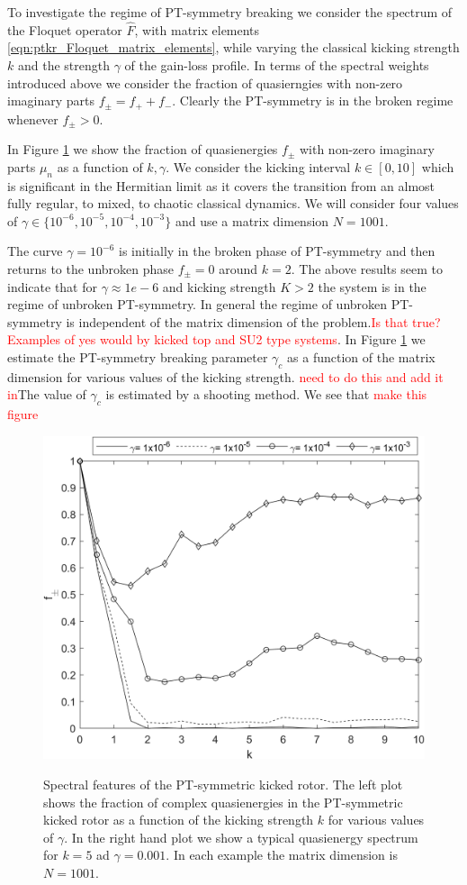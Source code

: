 \documentclass{iopart}
\begin{document}
To investigate the regime of PT-symmetry breaking we consider the spectrum of the Floquet operator $\hat{F}$, with matrix elements \ref{eqn:ptkr_Floquet_matrix_elements}, while varying the classical kicking strength $k$ and the strength $\gamma$ of the gain-loss profile. In terms of the spectral weights introduced above we consider the fraction of quasierngies with non-zero imaginary parts $f_{\pm}=f_{+}+f_{-}$. Clearly the PT-symmetry is in the broken regime whenever $f_{\pm}>0$.  

In Figure \ref{fig:ptkr_brokem_regieme} we show the fraction of quasienergies $f_{\pm}$ with non-zero imaginary parts $\mu_n$ as a function of $k,\gamma$. We consider the kicking interval $k\in[0,10]$ which is significant in the Hermitian limit as it covers the transition from an almost fully regular, to mixed, to chaotic classical dynamics. We will consider four values of $\gamma\in\lbrace10^{-6},10^{-5},10^{-4},10^{-3}\rbrace$ and use a matrix dimension $N=1001$.

The curve $\gamma=10^{-6}$ is initially in the broken phase of PT-symmetry and then returns to the unbroken phase $f_{\pm}=0$ around $k=2$.  The above results seem to indicate that for $\gamma\approx1e-6$ and kicking strength $K>2$ the system is in the regime of unbroken PT-symmetry. In general the regime of unbroken PT-symmetry is independent of the matrix dimension of the problem.\textcolor{red}{Is that true? Examples of yes would by kicked top and SU2 type systems}. In Figure \ref{fig:ptkr_brokem_regieme} we estimate the PT-symmetry breaking parameter $\gamma_c$ as a function of the matrix dimension for various values of the kicking strength. \textcolor{red}{need to do this and add it in}The value of $\gamma_c$ is estimated by a shooting method. We see that  \textcolor{red}{make this figure}

\begin{figure}
	\centering
	{\includegraphics[width=0.5\columnwidth]{PT_Broken_gamma_N500}}
	\caption{Spectral features of the PT-symmetric kicked rotor. The left plot shows the fraction of complex quasienergies in the PT-symmetric kicked rotor as a function of the kicking strength $k$ for various values of $\gamma$. In the right hand plot we show a typical quasienergy spectrum for $k=5$ ad $\gamma=0.001$. In each example the matrix dimension is $N=1001$.}
	\label{fig:ptkr_brokem_regieme}
\end{figure}
\end{document}
